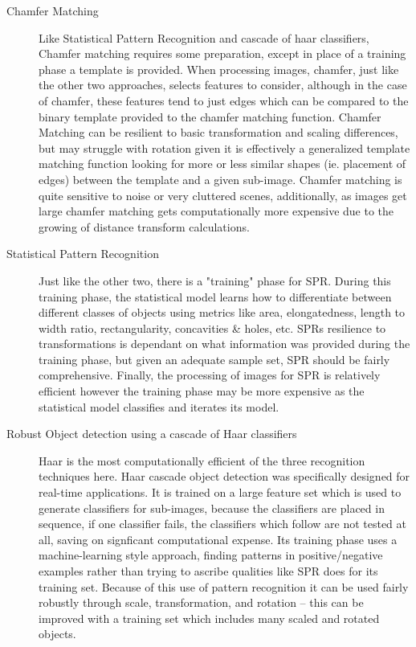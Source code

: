 \begin{description}
  \item[Chamfer Matching] Like Statistical Pattern Recognition and cascade of haar classifiers, Chamfer matching requires some preparation, except in place of a training phase a template is provided. When processing images, chamfer, just like the other two approaches, selects features to consider, although in the case of chamfer, these features tend to just edges which can be compared to the binary template provided to the chamfer matching function. Chamfer Matching can be resilient to basic transformation and scaling differences, but may struggle with rotation given it is effectively a generalized template matching function looking for more or less similar shapes (ie. placement of edges) between the template and a given sub-image. Chamfer matching is quite sensitive to noise or very cluttered scenes, additionally, as images get large chamfer matching gets computationally more expensive due to the growing of distance transform calculations.
  \item[Statistical Pattern Recognition] Just like the other two, there is a "training" phase for SPR. During this training phase, the statistical model learns how to differentiate between different classes of objects using metrics like area, elongatedness, length to width ratio, rectangularity, concavities \& holes, etc. SPRs resilience to transformations is dependant on what information was provided during the training phase, but given an adequate sample set, SPR should be fairly comprehensive. Finally, the processing of images for SPR is relatively efficient however the training phase may be more expensive as the statistical model classifies and iterates its model.
  \item[Robust Object detection using a cascade of Haar classifiers] Haar is the most computationally efficient of the three recognition techniques here. Haar cascade object detection was specifically designed for real-time applications. It is trained on a large feature set which is used to generate classifiers for sub-images, because the classifiers are placed in sequence, if one classifier fails, the classifiers which follow are not tested at all, saving on signficant computational expense. Its training phase uses a machine-learning style approach, finding patterns in positive/negative examples rather than trying to ascribe qualities like SPR does for its training set. Because of this use of pattern recognition it can be used fairly robustly through scale, transformation, and rotation -- this can be improved with a training set which includes many scaled and rotated objects. 
\end{description}